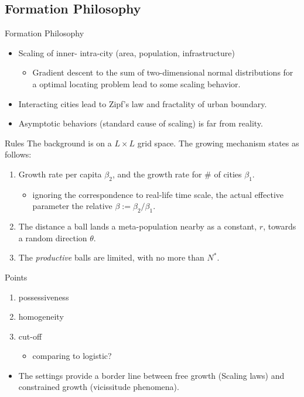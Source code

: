 \documentclass{beamer}
\begin{document}
\subsection{Formation Philosophy}
\begin{frame}{Formation Philosophy}
  \begin{itemize}
    \item Scaling of inner- intra-city (area, population, infrastructure)
    \begin{itemize}
      \item Gradient descent to the sum of two-dimensional normal distributions for a optimal locating problem lead to some scaling behavior.
    \end{itemize}
    \item Interacting cities lead to Zipf's law and fractality of urban boundary. 
    \item Asymptotic behaviors (standard cause of scaling) is far from reality.
  \end{itemize}
\end{frame}

\begin{frame}{Rules}
  The background is on a $L\times L$ grid space. The growing mechanism states as follows:
  \begin{enumerate}
    \item Growth rate per capita $\beta_2$, and the growth rate for \# of cities $\beta_1$. 
    \begin{itemize}
      \item ignoring the correspondence to real-life time scale, the actual effective parameter the relative $\beta:=\beta_2/\beta_1$.
    \end{itemize}
    \item The distance a ball lands a meta-population nearby as a constant, $r$, towards a random direction $\theta$. 
    \item The \emph{productive} balls are limited, with no more than $N^*$. 
  \end{enumerate}
\end{frame}

\begin{frame}{Points}
  \begin{enumerate}
    \item possessiveness
    \item homogeneity
    \item cut-off
    \begin{itemize}
    \item comparing to logistic?
    \end{itemize}
  \end{enumerate}
  \vspace{1cm}
  \begin{itemize}
    \item The settings provide a border line between free growth (Scaling laws) and constrained growth (vicissitude phenomena).
  \end{itemize}
  
\end{frame}
\end{document}
